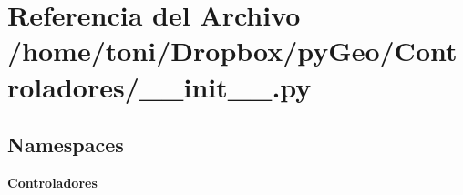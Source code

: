 \section{Referencia del Archivo /home/toni/\-Dropbox/py\-Geo/\-Controladores/\-\_\-\-\_\-init\-\_\-\-\_\-.py}
\label{Controladores_2____init_____8py}
\subsection*{Namespaces}
\begin{DoxyCompactItemize}
\item 
{\bf Controladores}
\end{DoxyCompactItemize}
